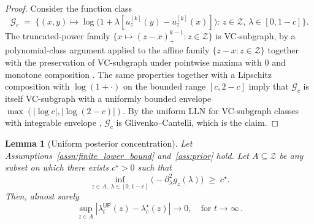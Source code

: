 \documentclass[12pt,twoside]{article}
\theoremstyle{plain}
\newtheorem{lemma}{Lemma}
\theoremstyle{definition}
\theoremstyle{remark}
\newcommand{\calG}{\mathcal{G}}
\newcommand{\calZ}{\mathcal{Z}}
\newcommand{\fbet}{\lambda}  %
\newcommand{\up}{\mathsf{UP}}
\begin{document}
\begin{proof}
Consider the function class
\begin{equation*}
    \calG_c \;=\; \bigl\{(x,y)\mapsto \log\bigl(1+\lambda[u_z^{[k]}(y)-u_z^{[k]}(x)]\bigr):\,z\in\calZ,\,\lambda\in[0,1-c]\bigr\}.
\end{equation*}
The truncated-power family $\{x\mapsto(z-x)_+^{k-1}:z\in\calZ\}$ is
VC-subgraph, by a polynomial-class argument applied to the affine
family $\{z-x:z\in\calZ\}$ together with the preservation of
VC-subgraph under pointwise maxima with $0$ and monotone composition
\citep[Lemmas 2.6.15 and 2.6.18]{vanderVaart_empirical_processes}. The same properties together with a Lipschitz composition with $\log(1+\cdot)$ on the bounded range $[c,2-c]$ imply that $\calG_c$ is itself VC-subgraph with a uniformly bounded envelope $\max(|\log c|,|\log(2-c)|)$. By the
uniform LLN for VC-subgraph classes with integrable envelope
\citep[Theorem 2.4.1]{vanderVaart_empirical_processes}, $\calG_c$ is Glivenko--Cantelli, which is the claim.
\end{proof}



\begin{lemma}[Uniform posterior concentration]\label{lem:posterior_concentration}
Let Assumptions~\ref{assn:finite_lower_bound} and~\ref{ass:prior} hold. Let $A\subseteq\calZ$ be any
subset on which there exists $c^\star>0$ such that
\begin{equation}\label{eq:uniform_curvature}
    \inf_{z\in A,\;\lambda\in[0,1-c]}\bigl(-\partial_\lambda^2 g_z(\lambda)\bigr) \;\ge\; c^\star.
\end{equation}
Then, almost surely
\begin{equation*}
    \sup_{z\in A}\left|\fbet_t^\up(z)-\fbet^\star_c(z)\right|
   \to0,\quad \text{for }t\to \infty\,.
\end{equation*}
\end{lemma}
\end{document}
